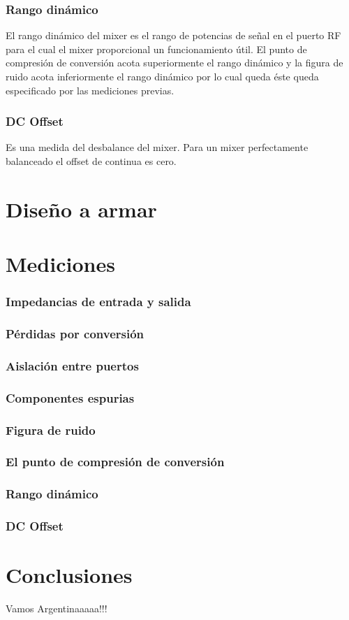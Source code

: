 \documentclass[a4paper,10pt]{article}
\begin{document}
		\subsubsection{Rango din\'amico}
		El rango din\'amico del mixer es el rango de potencias de se\~nal en el puerto RF para el cual el mixer proporcional un funcionamiento \'util.
		El punto de compresi\'on de conversi\'on acota superiormente el rango din\'amico y la figura de ruido acota inferiormente el rango din\'amico por lo cual queda \'este queda especificado por las mediciones previas.

		\subsubsection{DC Offset}
		Es una medida del desbalance del mixer. Para un mixer perfectamente balanceado el offset de continua es cero.


	\section{Diseño a armar}
	
	\section{Mediciones}
	\subsubsection{Impedancias de entrada y salida}
	\subsubsection{P\'erdidas por conversi\'on}
	\subsubsection{Aislación entre puertos}
	\subsubsection{Componentes espurias}
	\subsubsection{Figura de ruido}
	\subsubsection{El punto de compresi\'on de conversi\'on}
	\subsubsection{Rango din\'amico}
	\subsubsection{DC Offset}
	\newpage
	\section{Conclusiones}
	\indent Vamos Argentinaaaaa!!!
\end{document}
